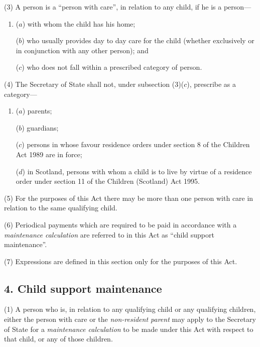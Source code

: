 \documentclass[12pt,a4paper]{article}
\begin{document}
(3) A person is a “person with care”, in relation to any child, if he is a person—
\begin{enumerate}\item[]
($a$) with whom the child has his home;

($b$) who usually provides day to day care for the child (whether exclusively or in conjunction with any other person); and

($c$) who does not fall within a prescribed category of person.
\end{enumerate}

(4) The Secretary of State shall not, under subsection (3)($c$), prescribe as a category—
\begin{enumerate}\item[]
($a$) parents;

($b$) guardians;

($c$) persons in whose favour residence orders under section 8 of the Children Act 1989 are in force;

($d$) in Scotland, persons 
with whom a child is to live by virtue of a residence order under section 11 of the Children (Scotland) Act 1995.  %
\end{enumerate}

(5) For the purposes of this Act there may be more than one person with care in relation to the same qualifying child.

(6) Periodical payments which are required to be paid in accordance with a 
\emph{maintenance calculation}  %
are referred to in this Act as “child support maintenance”.

(7) Expressions are defined in this section only for the purposes of this Act.


\subsection{4. Child support maintenance}

(1) A person who is, in relation to any qualifying child or any qualifying children, either the person with care or the 
\emph{non-resident parent}  %
may apply to the Secretary of State for a 
\emph{maintenance calculation}  %
to be made under this Act with respect to that child, or any of those children.
\end{document}
